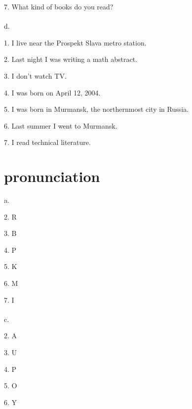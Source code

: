 \documentclass{article}
\begin{document}
7. What kind of books do you read?
\\ \\
d.


1. I live near the Prospekt Slava metro station.

2. Last night I was writing a math abstract.

3. I don't watch TV.

4. I was born on April 12, 2004.

5. I was born in Murmansk, the northernmost city in Russia.

6. Last summer I went to Murmansk.

7. I read technical literature.


\section{pronunciation}
a.

2. R

3. B

4. P

5. K

6. M

7. I
\\ \\
c. 

2. A

3. U

4. P

5. O

6. Y
\end{document}
